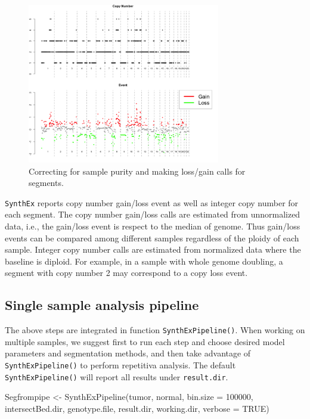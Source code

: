 \documentclass{article}
\newcommand{\code}[1]{\texttt{#1}}
\begin{document}
\begin{figure}
\begin{center}
\includegraphics[width=0.75\textwidth]{figure/purity-1}
\end{center}
\caption{Correcting for sample purity and making loss/gain calls for segments.}
\label{purity}
\end{figure}

\code{SynthEx} reports copy number gain/loss event as well as integer copy number for each segment. The copy number gain/loss calls are estimated from unnormalized data, i.e., the gain/loss event is respect to the median of genome. Thus gain/loss events can be compared among different samples regardless of the ploidy of each sample. Integer copy number calls are estimated from normalized data where the baseline is diploid. For example, in a sample with whole genome doubling, a segment with copy number 2 may correspond to a copy loss event.

\subsection{Single sample analysis pipeline}
The above steps are integrated in function \code{SynthExPipeline()}. When working on multiple samples, we suggest first to run each step and choose desired model parameters and segmentation methods, and then take advantage of \code{SynthExPipeline()} to perform repetitiva analysis. The default \code{SynthExPipeline()} will report all results under \code{result.dir}.
\begin{Schunk}
\begin{Sinput}
 Segfrompipe <- SynthExPipeline(tumor, normal, bin.size = 100000,
      intersectBed.dir, genotype.file,
      result.dir, working.dir, verbose = TRUE)
\end{Sinput}
\end{Schunk}
\end{document}
